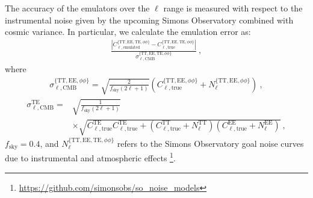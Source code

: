 \documentclass[fleqn,usenatbib]{mnras}
\begin{document}
The accuracy of the emulators over the $\ell$ range is measured with respect to the instrumental noise given by the upcoming Simons Observatory \citep{Ade19} combined with cosmic variance. In particular, we calculate the emulation error as:
\begin{align}
\label{eq:cl_cmb_error}
\frac{| C_{\ell, \textrm{emulated}}^{\{\textrm{TT}, \textrm{EE}, \textrm{TE}, \phi \phi\}} - C_{\ell, \textrm{true}}^{\{\textrm{TT}, \textrm{EE}, \textrm{TE},  \phi \phi\}}|} {\sigma_{\ell, \textrm{CMB}}^{\{\textrm{TT}, \textrm{EE}, \textrm{TE}, \phi \phi\}}} \ ,
\end{align}
where 
\begin{align}
\label{eq:cl_cmb_error_nonte}
\sigma_{\ell, \textrm{CMB}}^{\{\textrm{TT}, \textrm{EE}, \phi \phi\}} = \sqrt{\frac{2}{f_{\textrm{sky}}(2\ell+1)}} \left( C_{\ell, \textrm{true}}^{\{\textrm{TT}, \textrm{EE}, \phi \phi\}} + N_{\ell}^{\{\textrm{TT}, \textrm{EE}, \phi \phi\}} \right) \ , 
\end{align}
\begin{align}
\label{eq:cl_cmb_error_te}
\sigma_{\ell, \textrm{CMB}}^{\textrm{TE}} = & \sqrt{\frac{1}{f_{\textrm{sky}}(2\ell+1)}} \nonumber \\  & \times \sqrt{C_{\ell, \textrm{true}}^{\textrm{TE}} C_{\ell, \textrm{true}}^{\textrm{TE}} + \left( C_{\ell, \textrm{true}}^{\textrm{TT}} + N_{\ell}^{\textrm{TT}} \right) \left( C_{\ell, \textrm{true}}^{\textrm{EE}} + N_{\ell}^{\textrm{EE}}\right)} \ ,
\end{align}
$f_{\textrm{sky}} = 0.4$, and $ N_{\ell}^{\{\textrm{TT}, \textrm{EE}, \textrm{TE}, \phi \phi\}}$ refers to the Simons Observatory goal noise curves due to instrumental and atmospheric effects \citep{Ade19}\footnote{\url{https://github.com/simonsobs/so_noise_models}}. 
\end{document}
